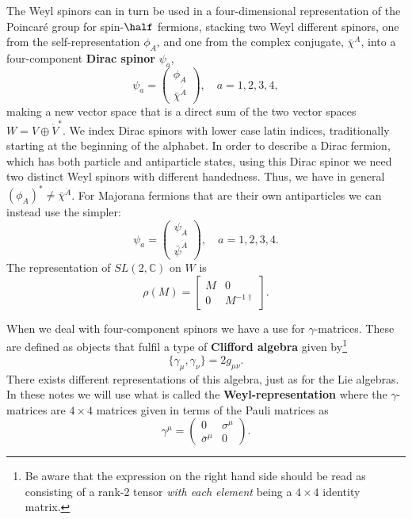 \documentclass[notes.tex]{subfiles}
\begin{document}
The Weyl spinors can in turn be used in a four-dimensional representation of the Poincaré group for spin-$\half$ fermions, stacking two Weyl different spinors, one from the self-representation $\phi_A$, and one from the complex conjugate,  $\bar{\chi}^{\dot{A}}$, into a four-component {\bf Dirac spinor} $\psi_a$, 
\begin{equation*}
\psi_a = \begin{pmatrix}\phi_A\\ \bar{\chi}^{\dot{A}}\end{pmatrix},\quad a=1,2,3,4,
\end{equation*}
making a new vector space that is a direct sum of the two vector spaces $W=V\oplus \dot{V}^*$. We index Dirac spinors with lower case latin indices, traditionally starting at the beginning of the alphabet.
In order to describe a Dirac fermion, which has both particle and antiparticle states, using this Dirac spinor we need two distinct Weyl spinors with different handedness. Thus, we have in general $(\phi_A)^* \neq \bar{\chi}^{\dot{A}}$.  For Majorana fermions that are their own antiparticles we can instead use the simpler:
\[\psi_a = \begin{pmatrix} \psi_A \\ \bar{\psi}^{\dot{A}}\end{pmatrix}, \quad a=1,2,3,4.\]
The representation of $SL(2,\mathbb{C})$ on $W$ is
\[ \rho(M)=\left[\begin{matrix} M & 0 \\ 0 & M^{-1 \dagger} \end{matrix}\right]. \]

When we deal with four-component spinors we have a use for $\gamma$-matrices. These are defined as objects that fulfil a type of {\bf Clifford algebra} given by\footnote{Be aware that the expression on the right hand side should be read as consisting of a rank-2 tensor {\it with each element} being a $4\times4$ identity matrix.}
\begin{equation}
\{\gamma_\mu,\gamma_\nu\}=2g_{\mu\nu}.
\end{equation}
There exists different representations of this algebra, just as for the Lie algebras. In these notes we will use what is called the {\bf Weyl-representation} where the $\gamma$-matrices are $4\times 4$ matrices given in terms of the Pauli matrices as
\begin{equation}
\gamma^\mu=\left(\begin{matrix} 0 & \sigma^\mu \\ \bar\sigma^\mu & 0 \end{matrix}\right).
\end{equation}
\end{document}
